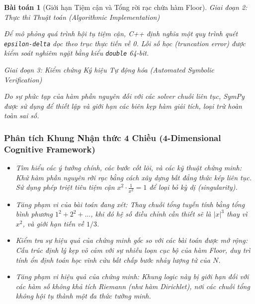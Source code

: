 \documentclass{article}
\newtheorem{baitoan}{Bài toán}
\begin{document}
\begin{baitoan}[Giới hạn Tiệm cận và Tổng rời rạc chứa hàm Floor]
\vspace{0.5em}\noindent\emph{Giai đoạn 2: Thực thi Thuật toán (Algorithmic Implementation)}
 
 Để mô phỏng quá trình hội tụ tiệm cận, C++ định nghĩa một quy trình quét \texttt{epsilon-delta} dọc theo trục thực tiến về 0. Lỗi số học (truncation error) được kiểm soát nghiêm ngặt bằng kiểu \texttt{double} 64-bit.



\vspace{0.5em}\noindent\emph{Giai đoạn 3: Kiểm chứng Ký hiệu Tự động hóa (Automated Symbolic Verification)}
 
 Do sự phức tạp của hàm phần nguyên đối với các \textit{solver} chuỗi liên tục, \textsf{SymPy} được sử dụng để thiết lập và giới hạn các biên kẹp hàm giải tích, loại trừ hoàn toàn sai số.



 \subsubsection*{Phân tích Khung Nhận thức 4 Chiều (4-Dimensional Cognitive Framework)}
 \begin{itemize}
 \item \textit{Tìm hiểu các ý tưởng chính, các bước cốt lõi, và các kỹ thuật chứng minh}: Khử hàm phần nguyên rời rạc bằng cách xây dựng bất đẳng thức kép liên tục. Sử dụng phép triệt tiêu tiệm cận $x^2 \cdot \frac{1}{x^2} = 1$ để loại bỏ kỳ dị (singularity).
 \item \textit{Tăng phạm vi của bài toán đang xét}: Thay chuỗi tổng tuyến tính bằng tổng bình phương $1^2 + 2^2 + \dots$, khi đó hệ số điều chỉnh cần thiết sẽ là $|x|^3$ thay vì $x^2$, và giới hạn tiến về $1/3$.
 \item \textit{Kiểm tra sự hiệu quả của chứng minh gốc so với các bài toán được mở rộng}: Cấu trúc định lý kẹp vô cảm với sự nhiễu loạn cục bộ của hàm Floor, duy trì tính ổn định toán học vĩnh cửu bất chấp bước nhảy lượng tử của $N$.
 \item \textit{Tăng phạm vi hiệu quả của chứng minh}: Khung logic này bị giới hạn đối với các hàm số không khả tích Riemann (như hàm Dirichlet), nơi các chuỗi tổng không hội tụ thành một đa thức tường minh.
 \end{itemize}
\end{baitoan}
\end{document}
